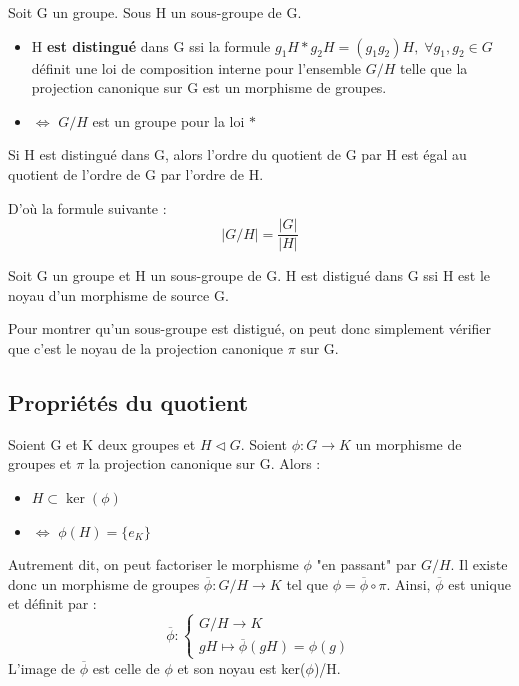 \begin{theorem}
	Soit G un groupe. Sous H un sous-groupe de G. 
	\begin{itemize}
		\item[] H \textbf{est distingué} dans G ssi la formule $g_1H \ast g_2H = (g_1g_2)H, \; \forall g_1,g_2 \in G$ 
		définit une loi de composition interne pour l'ensemble $G/H$ telle que la projection canonique sur G est un morphisme de groupes. 
		\item[]$\iff$  $G/H$ est un groupe pour la loi $\ast$  
	\end{itemize}
\end{theorem}

\begin{corollary}
	Si H est distingué dans G, alors l'ordre du quotient de G par H est égal au quotient de l'ordre de G par l'ordre de H. 

	D'où la formule suivante :
		\[ |G/H| = \frac{|G|}{|H|} \]
\end{corollary}

\begin{corollary}
	Soit G un groupe et H un sous-groupe de G. H est distigué dans G ssi H est le noyau d'un morphisme de source G. 
\end{corollary}

\begin{remark}
	Pour montrer qu'un sous-groupe est distigué, on peut donc simplement vérifier que c'est le noyau de la projection canonique $\pi$ sur G. 
\end{remark}

\subsection{Propriétés du quotient}

\begin{theorem}
	Soient G et K deux groupes et $H \triangleleft G$. Soient $\phi : G \longrightarrow K$ un morphisme de groupes 
	et $\pi$ la projection canonique sur G. Alors :
	\begin{itemize}
		\item[] $H \subset \ker(\phi)$ 
		\item[]$\iff$  $\phi (H) = \{e_K\}$ 
	\end{itemize}
	Autrement dit, on peut factoriser le morphisme $\phi$ "en passant" par $G/H$. 
	Il existe donc un morphisme de groupes $\overline{\phi} : G/H \longrightarrow K$ tel que $\phi = \overline{\phi} \circ \pi$. 
	Ainsi, $\overline{\phi}$ est unique et définit par : 
		\[\overline{\phi} : 
			\begin{cases}
				G/H \longrightarrow K \\ 
				gH \longmapsto \overline{\phi}(gH) = \phi(g)
			\end{cases}
		\]
	L'image de $\overline{\phi}$ est celle de $\phi$ et son noyau est ker($\phi$)/H.
\end{theorem}

